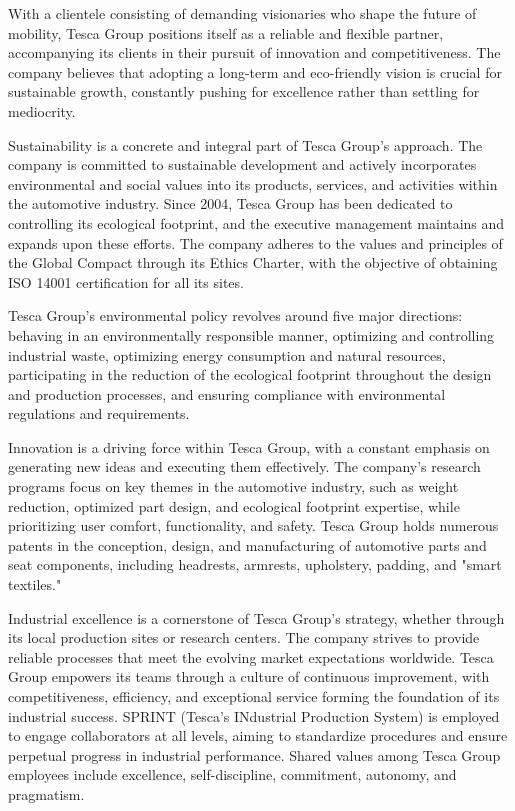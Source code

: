 With a clientele consisting of demanding visionaries who shape the future of mobility, Tesca Group positions itself as a reliable and flexible partner, accompanying its clients in their pursuit of innovation and competitiveness. The company believes that adopting a long-term and eco-friendly vision is crucial for sustainable growth, constantly pushing for excellence rather than settling for mediocrity.

Sustainability is a concrete and integral part of Tesca Group's approach. The company is committed to sustainable development and actively incorporates environmental and social values into its products, services, and activities within the automotive industry. Since 2004, Tesca Group has been dedicated to controlling its ecological footprint, and the executive management maintains and expands upon these efforts. The company adheres to the values and principles of the Global Compact through its Ethics Charter, with the objective of obtaining ISO 14001 certification for all its sites.

Tesca Group's environmental policy revolves around five major directions: behaving in an environmentally responsible manner, optimizing and controlling industrial waste, optimizing energy consumption and natural resources, participating in the reduction of the ecological footprint throughout the design and production processes, and ensuring compliance with environmental regulations and requirements.

Innovation is a driving force within Tesca Group, with a constant emphasis on generating new ideas and executing them effectively. The company's research programs focus on key themes in the automotive industry, such as weight reduction, optimized part design, and ecological footprint expertise, while prioritizing user comfort, functionality, and safety. Tesca Group holds numerous patents in the conception, design, and manufacturing of automotive parts and seat components, including headrests, armrests, upholstery, padding, and "smart textiles."

Industrial excellence is a cornerstone of Tesca Group's strategy, whether through its local production sites or research centers. The company strives to provide reliable processes that meet the evolving market expectations worldwide. Tesca Group empowers its teams through a culture of continuous improvement, with competitiveness, efficiency, and exceptional service forming the foundation of its industrial success. SPRINT (Tesca's INdustrial Production System) is employed to engage collaborators at all levels, aiming to standardize procedures and ensure perpetual progress in industrial performance. Shared values among Tesca Group employees include excellence, self-discipline, commitment, autonomy, and pragmatism.

